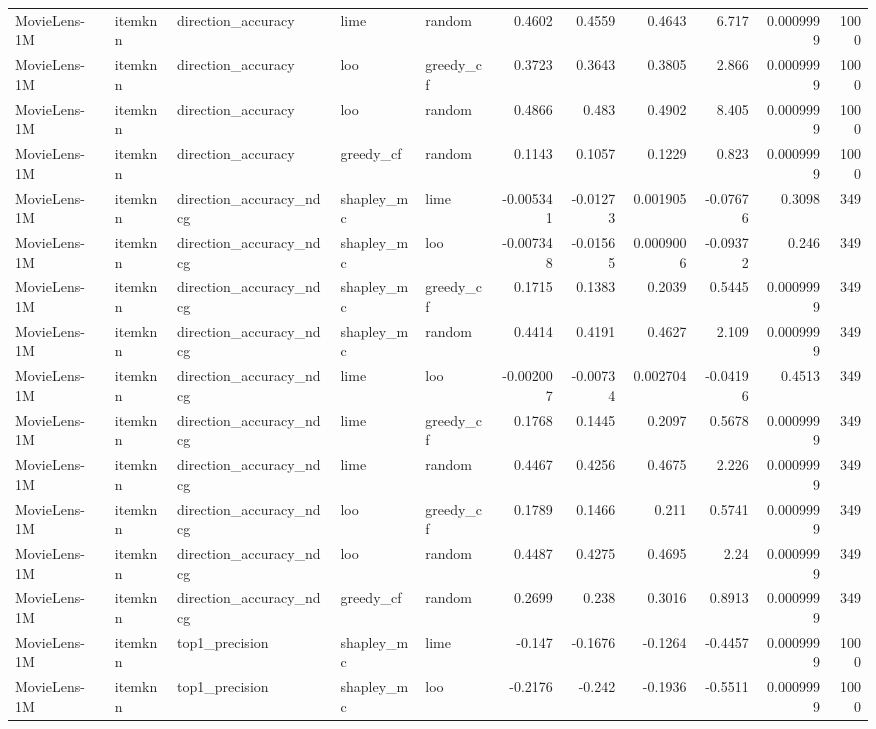 \begin{table}[t]
\begin{tabular}{lllllrrrrrr}
MovieLens-1M & itemknn & direction\_accuracy & lime & random & 0.4602 & 0.4559 & 0.4643 & 6.717 & 0.0009999 & 1000 \\
MovieLens-1M & itemknn & direction\_accuracy & loo & greedy\_cf & 0.3723 & 0.3643 & 0.3805 & 2.866 & 0.0009999 & 1000 \\
MovieLens-1M & itemknn & direction\_accuracy & loo & random & 0.4866 & 0.483 & 0.4902 & 8.405 & 0.0009999 & 1000 \\
MovieLens-1M & itemknn & direction\_accuracy & greedy\_cf & random & 0.1143 & 0.1057 & 0.1229 & 0.823 & 0.0009999 & 1000 \\
MovieLens-1M & itemknn & direction\_accuracy\_ndcg & shapley\_mc & lime & -0.005341 & -0.01273 & 0.001905 & -0.07676 & 0.3098 & 349 \\
MovieLens-1M & itemknn & direction\_accuracy\_ndcg & shapley\_mc & loo & -0.007348 & -0.01565 & 0.0009006 & -0.09372 & 0.246 & 349 \\
MovieLens-1M & itemknn & direction\_accuracy\_ndcg & shapley\_mc & greedy\_cf & 0.1715 & 0.1383 & 0.2039 & 0.5445 & 0.0009999 & 349 \\
MovieLens-1M & itemknn & direction\_accuracy\_ndcg & shapley\_mc & random & 0.4414 & 0.4191 & 0.4627 & 2.109 & 0.0009999 & 349 \\
MovieLens-1M & itemknn & direction\_accuracy\_ndcg & lime & loo & -0.002007 & -0.00734 & 0.002704 & -0.04196 & 0.4513 & 349 \\
MovieLens-1M & itemknn & direction\_accuracy\_ndcg & lime & greedy\_cf & 0.1768 & 0.1445 & 0.2097 & 0.5678 & 0.0009999 & 349 \\
MovieLens-1M & itemknn & direction\_accuracy\_ndcg & lime & random & 0.4467 & 0.4256 & 0.4675 & 2.226 & 0.0009999 & 349 \\
MovieLens-1M & itemknn & direction\_accuracy\_ndcg & loo & greedy\_cf & 0.1789 & 0.1466 & 0.211 & 0.5741 & 0.0009999 & 349 \\
MovieLens-1M & itemknn & direction\_accuracy\_ndcg & loo & random & 0.4487 & 0.4275 & 0.4695 & 2.24 & 0.0009999 & 349 \\
MovieLens-1M & itemknn & direction\_accuracy\_ndcg & greedy\_cf & random & 0.2699 & 0.238 & 0.3016 & 0.8913 & 0.0009999 & 349 \\
MovieLens-1M & itemknn & top1\_precision & shapley\_mc & lime & -0.147 & -0.1676 & -0.1264 & -0.4457 & 0.0009999 & 1000 \\
MovieLens-1M & itemknn & top1\_precision & shapley\_mc & loo & -0.2176 & -0.242 & -0.1936 & -0.5511 & 0.0009999 & 1000 \\

\end{tabular}
\end{table}
